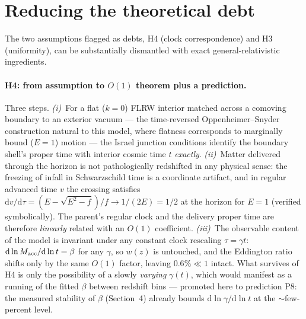 \documentclass[11pt]{article}
\begin{document}
\section{Reducing the theoretical debt}
The two assumptions flagged as debts, H4 (clock correspondence) and H3 (uniformity), can be substantially dismantled with exact general-relativistic ingredients.

\paragraph{H4: from assumption to $O(1)$ theorem plus a prediction.} Three steps. \emph{(i)}~For a flat ($k=0$) FLRW interior matched across a comoving boundary to an exterior vacuum --- the time-reversed Oppenheimer--Snyder construction natural to this model, where flatness corresponds to marginally bound ($E=1$) motion --- the Israel junction conditions identify the boundary shell's proper time with interior cosmic time $t$ \emph{exactly}. \emph{(ii)}~Matter delivered through the horizon is not pathologically redshifted in any physical sense: the freezing of infall in Schwarzschild time is a coordinate artifact, and in regular advanced time $v$ the crossing satisfies $\mathrm{d}v/\mathrm{d}\tau = (E-\sqrt{E^2-f})/f \to 1/(2E) = 1/2$ at the horizon for $E=1$ (verified symbolically). The parent's regular clock and the delivery proper time are therefore \emph{linearly} related with an $O(1)$ coefficient. \emph{(iii)}~The observable content of the model is invariant under any constant clock rescaling $\tau = \gamma t$: $\mathrm{d}\ln M_{\rm acc}/\mathrm{d}\ln t = \beta$ for any $\gamma$, so $w(z)$ is untouched, and the Eddington ratio shifts only by the same $O(1)$ factor, leaving $0.6\% \ll 1$ intact. What survives of H4 is only the possibility of a slowly \emph{varying} $\gamma(t)$, which would manifest as a running of the fitted $\beta$ between redshift bins --- promoted here to prediction P8: the measured stability of $\beta$ (Section~4) already bounds $\mathrm{d}\ln\gamma/\mathrm{d}\ln t$ at the $\sim$few-percent level.
\end{document}
